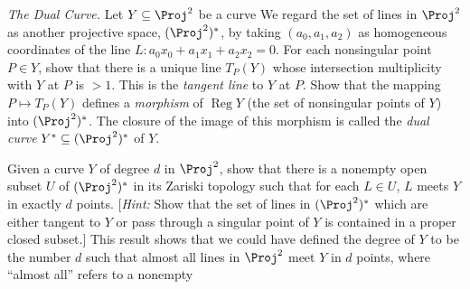 { \emph{The Dual Curve.} Let $Y\subseteq\Proj^2$ be a curve\hypertarget{err-I-7-3}{} We regard the set of lines in $\Proj^2$ as another projective space, $(\Proj^2)^*$, by taking $(a_0,a_1,a_2)$ as homogeneous coordinates of the line $L\colon a_0x_0+a_1x_1+a_2x_2=0$. For each nonsingular point $P\in Y$, show that there is a unique line $T_P(Y)$ whose intersection multiplicity with $Y$ at $P$ is $>1$. This is the \emph{tangent line} to $Y$ at $P$. Show that the mapping $P\mapsto T_P(Y)$ defines a \emph{morphism} of $\operatorname{Reg}Y$ (the set of nonsingular points of $Y$) into $(\Proj^2)^*$. The closure of the image of this morphism is called the \emph{dual curve} $Y^*\subseteq(\Proj^2)^*$ of $Y$.

 Given a curve $Y$ of degree $d$ in $\Proj^2$, show that there is a nonempty open subset $U$ of $(\Proj^2)^*$ in its Zariski topology such that for each $L\in U$, $L$ meets $Y$ in exactly $d$ points. [\emph{Hint:} Show that the set of lines in $(\Proj^2)^*$ which are either tangent to $Y$ or pass through a singular point of $Y$ is contained in a proper closed subset.] This result shows that we could have defined the degree of $Y$ to be the number $d$ such that almost all lines in $\Proj^2$ meet $Y$ in $d$ points, where \textquotedblleft{}almost all\textquotedblright{} refers to a nonempty}

